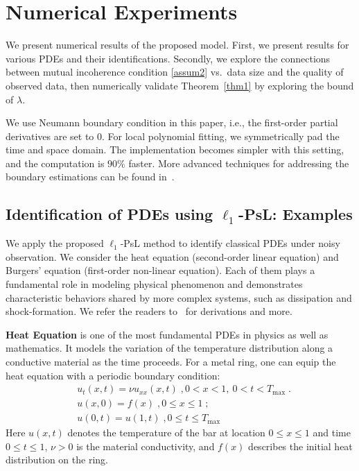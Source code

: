 \documentclass[a4paper,11pt]{article}
\theoremstyle{definition}
\begin{document}
\section{Numerical Experiments}\label{sec.numerical}

We present numerical results of the proposed model.  First, we present results for various PDEs and their identifications.  Secondly, we explore the connections between mutual incoherence condition \eqref{assum2} vs.~data size and the quality of observed data, then numerically validate Theorem~\ref{thm1} by exploring the bound of $\lambda$.

We use  Neumann boundary condition in this paper, i.e., the first-order partial derivatives are set to $0$.   For local polynomial fitting, we symmetrically pad the time and space domain.  The implementation becomes simpler with this setting, and the computation is $90\%$ faster.   More advanced techniques for addressing the boundary estimations can be found in~\cite{cheng1997automatic,hastie1993local}.

\subsection{Identification of PDEs using $\ell_1$-PsL: Examples}
We apply the proposed $\ell_1$-PsL method to identify  classical PDEs under noisy observation.  We consider the heat equation (second-order linear equation) and Burgers' equation (first-order non-linear equation). Each of them plays a fundamental role in modeling physical phenomenon and demonstrates characteristic behaviors shared by more complex systems, such as dissipation and shock-formation. We refer the readers to~\cite{haberman1983elementary} for derivations and more.

\textbf{Heat Equation} is one of the most fundamental PDEs in physics as well as mathematics. It models the variation of the temperature distribution along a conductive material as the time proceeds. For a metal ring, one can equip the heat equation with a periodic boundary condition:
\begin{align}
&u_t(x,t) = \nu u_{xx}(x,t)\;,0<x<1,~0<t<T_{\max}\;.\label{eq.heatPDE}\\
&u(x,0)=f(x)\;, 0\leq x\leq 1\;;\nonumber \\%
&u(0,t)=u(1,t)\;,0\leq t\leq T_{\max}\nonumber %
\end{align}
Here $u(x,t)$ denotes the temperature of the bar at location $0\leq x\leq 1 $ and time $0\leq t\leq 1$, $\nu>0$ is the material conductivity, and $f(x)$ describes the initial heat distribution on the ring.
\end{document}
